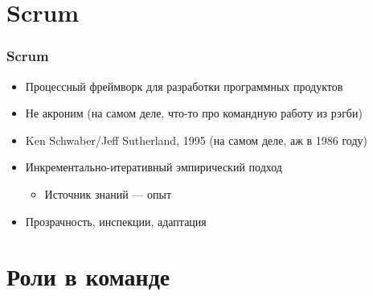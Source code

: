 \documentclass{../../slides-style}
\begin{document}
    \begin{frame}[plain]
        \titlepage
    \end{frame}

    \section{Scrum}

    \begin{frame}
        \frametitle{Scrum}
        \begin{itemize}
            \item Процессный фреймворк для разработки программных продуктов
            \item Не акроним (на самом деле, что-то про командную работу из
            рэгби)
            \item Ken Schwaber/Jeff Sutherland, 1995 (на самом деле, аж в 1986
            году)
            \item Инкрементально-итеративный эмпирический подход
            \begin{itemize}
                \item Источник знаний --- опыт
            \end{itemize}
            \item Прозрачность, инспекции, адаптация
        \end{itemize}
    \end{frame}

    \section{Роли в команде}
\end{document}

